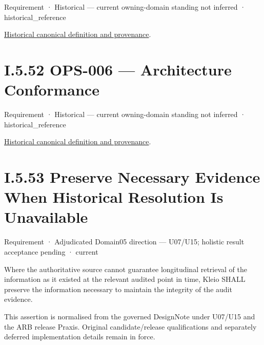 \label{element:01e7d6168d554048a424ef75a6556040}
{\small Requirement · Historical — current owning-domain standing not inferred · historical\_reference}\par
\href{../../../../continuum/motivation/requirement/01e7d6168d554048a424ef75a6556040.md}{Historical canonical definition and provenance}.\par
\section*{I.5.52 OPS-006 — Architecture Conformance}
\label{navigation:I.5.52}

\label{element:dee1792d83bf413f974fc24802084872}
{\small Requirement · Historical — current owning-domain standing not inferred · historical\_reference}\par
\href{../../../../continuum/motivation/requirement/dee1792d83bf413f974fc24802084872.md}{Historical canonical definition and provenance}.\par
\section*{I.5.53 Preserve Necessary Evidence When Historical Resolution Is Unavailable}
\label{navigation:I.5.53}

\label{element:81ce6a25725e41bb8e92c945f53c8b4c}
{\small Requirement · Adjudicated Domain05 direction — U07/U15; holistic result acceptance pending · current}\par

Where the authoritative source cannot guarantee longitudinal retrieval of the information as it existed at the relevant audited point in time, Kleio SHALL preserve the information necessary to maintain the integrity of the audit evidence.



This assertion is normalised from the governed DesignNote under U07/U15 and the ARB release Praxis. Original candidate/release qualifications and separately deferred implementation details remain in force.



